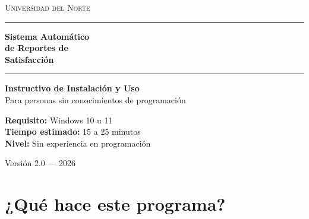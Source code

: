 \documentclass[12pt, letterpaper]{article}
\begin{document}
\begin{titlepage}
  \pagecolor{uninorteazul}
  \color{white}
  \centering
  \vspace*{2cm}

  {\fontsize{72}{80}\selectfont \faFileMedical}

  \vspace{1cm}
  {\fontsize{11}{13}\selectfont\scshape Universidad del Norte}

  \vspace{0.4cm}
  \rule{10cm}{0.5pt}
  \vspace{0.6cm}

  {\fontsize{28}{34}\selectfont\bfseries
    Sistema Automático\\[0.3em]
    de Reportes de\\[0.3em]
    Satisfacción
  }

  \vspace{0.8cm}
  \rule{10cm}{0.5pt}
  \vspace{0.8cm}

  {\fontsize{16}{20}\selectfont
    \textbf{Instructivo de Instalación y Uso}\\[0.4em]
    \normalsize Para personas sin conocimientos de programación
  }

  \vfill

  \begin{tcolorbox}[
    colback=white!15!uninorteazul,
    colframe=white,
    width=10cm,
    rounded corners, arc=6pt,
    boxrule=1pt
  ]
    \centering\color{white}
    \small
    \faWindows\; \textbf{Requisito:} Windows 10 u 11\\[4pt]
    \faClock\; \textbf{Tiempo estimado:} 15 a 25 minutos\\[4pt]
    \faDesktop\; \textbf{Nivel:} Sin experiencia en programación
  \end{tcolorbox}

  \vspace{1.5cm}
  {\small Versión 2.0 — 2026}

\end{titlepage}
\nopagecolor

\newpage
\tableofcontents
\newpage

\section{¿Qué hace este programa?}
\end{document}
